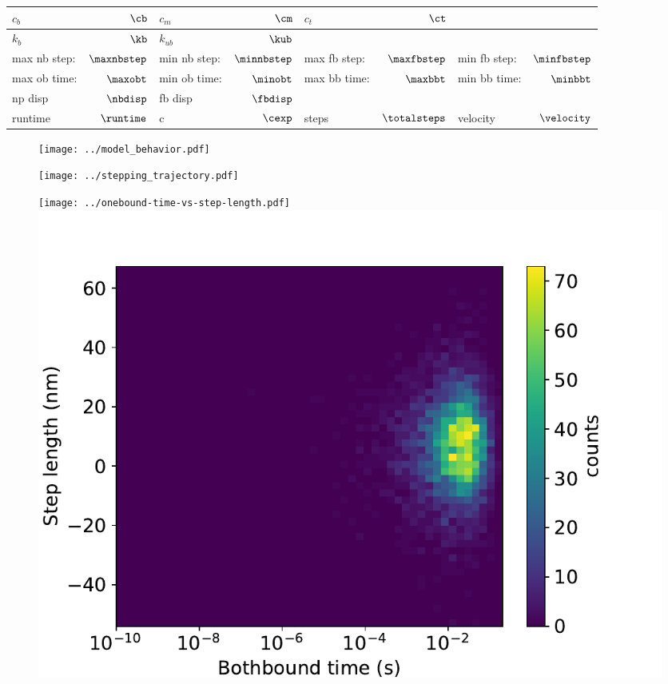 \documentclass[]{article}
\begin{document}
\begin{table}[tbhp]
  \centering
  \begin{tabular}{|lr|lr|lr|lr|}
    \toprule
    $c_b$ & $\cb$ &
    $c_m$ & $\cm$ &
    $c_t$ & $\ct$ & &\\
    \midrule
    $k_b$ & $\kb$ &
    $k_{ub}$ & $\kub$ & & & &\\
    \midrule
    max nb step: & $\maxnbstep$ &
    min nb step: & $\minnbstep$ &
    max fb step: & $\maxfbstep$ &
    min fb step: & $\minfbstep$\\
    \midrule
    max ob time: & $\maxobt$ &
    min ob time: & $\minobt$ &
    max bb time: & $\maxbbt$ &
    min bb time: & $\minbbt$\\
    \midrule
    np disp & $\nbdisp$ &
    fb disp & $\fbdisp$ & & & &\\
    \midrule
    runtime & $\runtime$ &
    c & $\cexp$ &
    steps & $\totalsteps$ &
    velocity & $\velocity$\\
    \midrule
  \end{tabular}
\end{table}

\begin{figure}[tbhp]
  \centering
  \texttt{[image: ../model\_behavior.pdf]}
\end{figure}


\begin{figure}[tbhp]
  \texttt{[image: ../stepping\_trajectory.pdf]}
\end{figure}

\begin{figure}[tbhp]
  \centering
  \texttt{[image: ../onebound-time-vs-step-length.pdf]}%
  \includegraphics[width=0.5\columnwidth]{../bothbound-time-vs-step-length.pdf}
\end{figure}
\end{document}
